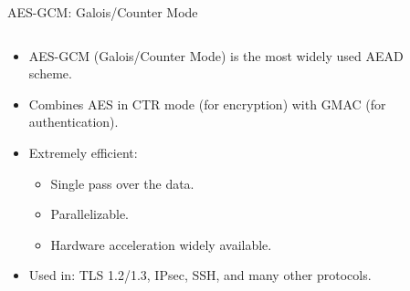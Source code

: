 \documentclass[aspectratio=169, lualatex, handout]{beamer}
\begin{document}
\begin{frame}{AES-GCM: Galois/Counter Mode}
	\begin{columns}[c]
		\begin{column}{0.6\textwidth}
			\begin{itemize}
				\item AES-GCM (Galois/Counter Mode) is the most widely used AEAD scheme.
				\item Combines AES in CTR mode (for encryption) with GMAC (for authentication).
				\item Extremely efficient:
				      \begin{itemize}
					      \item Single pass over the data.
					      \item Parallelizable.
					      \item Hardware acceleration widely available.
				      \end{itemize}
				\item Used in: TLS 1.2/1.3, IPsec, SSH, and many other protocols.
			\end{itemize}
		\end{column}
		\begin{column}{0.4\textwidth}
			\begin{center}
			\end{center}
		\end{column}
	\end{columns}
\end{frame}
\end{document}
